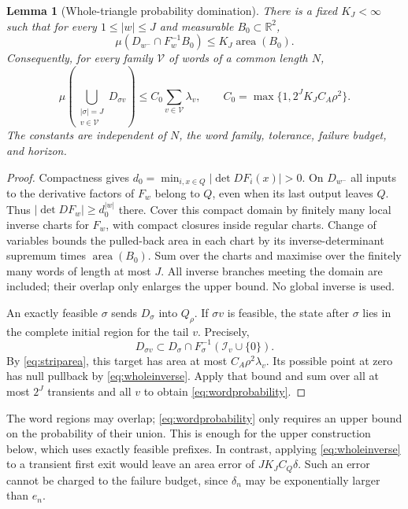 \documentclass[11pt]{amsart}
\newtheorem{lemma}[theorem]{Lemma}
\theoremstyle{definition}
\theoremstyle{remark}
\newcommand{\R}{\mathbb R}
\newcommand{\area}{\operatorname{area}}
\numberwithin{equation}{section}
\begin{document}
\begin{lemma}[Whole-triangle probability domination]\label{lem:probtransport}
There is a fixed $K_J<\infty$ such that for every $1\le|w|\le J$
and measurable $B_0\subset\R^2$,
\begin{equation}\label{eq:wholeinverse}
\mu(D_{w^-}\cap F_w^{-1}B_0)\le K_J\area(B_0).
\end{equation}
Consequently, for every family $\mathcal V$ of words of a common
length $N$,
\begin{equation}\label{eq:wordprobability}
\mu\!\left(\bigcup_{\substack{|\sigma|=J\\v\in\mathcal V}}
D_{\sigma v}\right)\le C_0\sum_{v\in\mathcal V}\lambda_v,
\qquad C_0=\max\{1,2^JK_JC_A\rho^2\}.
\end{equation}
The constants are independent of $N$, the word family, tolerance,
failure budget, and horizon.
\end{lemma}
\begin{proof}
Compactness gives $d_0=\min_{i,x\in Q}|\det DF_i(x)|>0$.
On $D_{w^-}$ all inputs to the derivative factors of $F_w$
belong to $Q$, even when its last output leaves $Q$. Thus
$|\det DF_w|\ge d_0^{|w|}$ there. Cover this compact domain by
finitely many local inverse charts for $F_w$, with compact closures
inside regular charts. Change of variables bounds the pulled-back
area in each chart by its inverse-determinant supremum times
$\area(B_0)$. Sum over the charts and maximise over the finitely
many words of length at most $J$. All inverse branches meeting the
domain are included; their overlap only enlarges the upper bound.
No global inverse is used.

An exactly feasible $\sigma$ sends $D_\sigma$ into $Q_\rho$.
If $\sigma v$ is feasible, the state after $\sigma$ lies in the
complete initial region for the tail $v$. Precisely,
\[
D_{\sigma v}\subset
D_\sigma\cap F_\sigma^{-1}(\mathcal I_v\cup\{0\}).
\]
By \eqref{eq:striparea}, this target has area at most
$C_A\rho^2\lambda_v$. Its possible point at zero has null
pullback by \eqref{eq:wholeinverse}. Apply that bound and sum
over all at most $2^J$ transients and all $v$ to obtain
\eqref{eq:wordprobability}.
\end{proof}

The word regions may overlap; \eqref{eq:wordprobability} only
requires an upper bound on the probability of their union.
This is enough for the upper construction below, which uses exactly
feasible prefixes. In contrast, applying \eqref{eq:wholeinverse}
to a transient first exit would leave an area error of
$JK_JC_Q\delta$. Such an error cannot be charged to the failure
budget, since $\delta_n$ may be exponentially larger than $e_n$.
\end{document}
